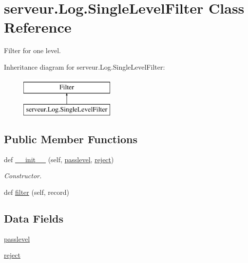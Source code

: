 \hypertarget{classserveur_1_1_log_1_1_single_level_filter}{}\section{serveur.\+Log.\+Single\+Level\+Filter Class Reference}
\label{classserveur_1_1_log_1_1_single_level_filter}


Filter for one level.  


Inheritance diagram for serveur.\+Log.\+Single\+Level\+Filter\+:\begin{figure}[H]
\begin{center}
\leavevmode
\includegraphics[height=2.000000cm]{classserveur_1_1_log_1_1_single_level_filter}
\end{center}
\end{figure}
\subsection*{Public Member Functions}
\begin{DoxyCompactItemize}
\item 
def \hyperlink{classserveur_1_1_log_1_1_single_level_filter_a9afdd5aad462a02c6f2ce0855b01b3e5}{\+\_\+\+\_\+init\+\_\+\+\_\+} (self, \hyperlink{classserveur_1_1_log_1_1_single_level_filter_aefec84fbdc8b4477c008f38b502924af}{passlevel}, \hyperlink{classserveur_1_1_log_1_1_single_level_filter_a2a225e36965f3ef1c4ae8f0f7f0eb56a}{reject})
\begin{DoxyCompactList}\small\item\em Constructor. \end{DoxyCompactList}\item 
def \hyperlink{classserveur_1_1_log_1_1_single_level_filter_ad39b18f428f12ce3a2e1687c1066b5f9}{filter} (self, record)
\end{DoxyCompactItemize}
\subsection*{Data Fields}
\begin{DoxyCompactItemize}
\item 
\hyperlink{classserveur_1_1_log_1_1_single_level_filter_aefec84fbdc8b4477c008f38b502924af}{passlevel}
\item 
\hyperlink{classserveur_1_1_log_1_1_single_level_filter_a2a225e36965f3ef1c4ae8f0f7f0eb56a}{reject}
\end{DoxyCompactItemize}


